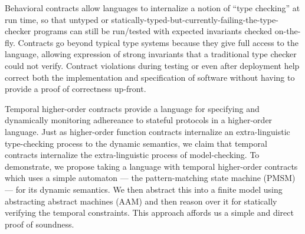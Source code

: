 Behavioral contracts allow languages to internalize a notion of ``type checking'' at run time, so that untyped or statically-typed-but-currently-failing-the-type-checker programs can still be run/tested with expected invariants checked on-the-fly.
%
Contracts go beyond typical type systems because they give full access to the language, allowing expression of strong invariants that a traditional type checker could not verify.
%
Contract violations during testing or even after deployment help correct both the implementation and specification of software without having to provide a proof of correctness up-front.

Temporal higher-order contracts provide a language for specifying and dynamically monitoring adhereance to stateful protocols in a higher-order language.
%
Just as higher-order function contracts internalize an extra-linguistic type-checking process to the dynamic semantics, we claim that temporal contracts internalize the extra-linguistic process of model-checking.
%
To demonstrate, we propose taking a language with temporal higher-order contracts which uses a simple automaton --- the pattern-matching state machine (PMSM) --- for its dynamic semantics.
%
We then abstract this into a finite model using abstracting abstract machines (AAM) and then reason over it for statically verifying the temporal constraints.
%
This approach affords us a simple and direct proof of soundness.